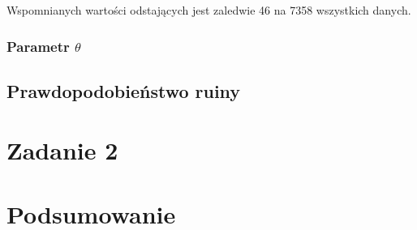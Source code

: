 \documentclass[12pt]{mwart}
\begin{document}
	\noindent Wspomnianych wartości odstających jest zaledwie 46 na 7358 wszystkich danych. 


	
	\subsubsection{Parametr {\boldmath $\theta$}}
	
	
	
	\subsection{Prawdopodobieństwo ruiny}
	
	
	
	
	\section{Zadanie 2}
	
	
	
	\section{Podsumowanie}
	
	
	
	\newpage
	\begin{thebibliography}{1}
		\url{}
	\end{thebibliography}
\end{document}
